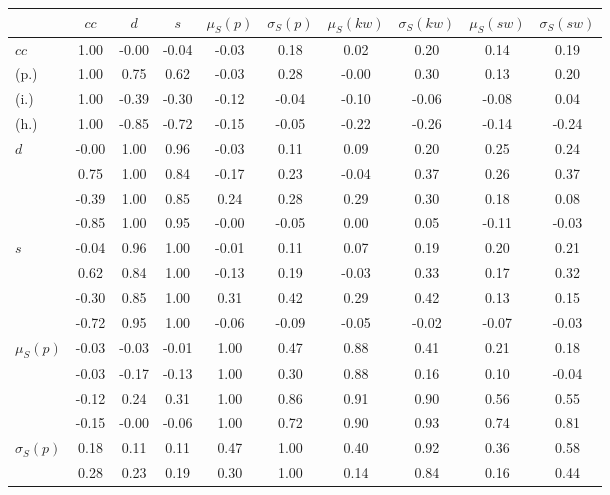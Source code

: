 \begin{table*}[h!]
\begin{center}
\begin{tabular}{| l | c | c | c | c | c | c | c | c | c |}\hline
 & $cc$ & $d$ & $s$ & $\mu_S(p)$ & $\sigma_S(p)$ & $\mu_S(kw)$ & $\sigma_S(kw)$ & $\mu_S(sw)$ & $\sigma_S(sw)$ \\\hline
$cc$ & 1.00  & -0.00  & -0.04  & -0.03  & 0.18  & 0.02  & 0.20  & 0.14  & 0.19 \\\hline
(p.) & 1.00  & 0.75  & 0.62  & -0.03  & 0.28  & -0.00  & 0.30  & 0.13  & 0.20 \\\hline
(i.) & 1.00  & -0.39  & -0.30  & -0.12  & -0.04  & -0.10  & -0.06  & -0.08  & 0.04 \\\hline
(h.) & 1.00  & -0.85  & -0.72  & -0.15  & -0.05  & -0.22  & -0.26  & -0.14  & -0.24 \\\hline
$d$ & -0.00  & 1.00  & 0.96  & -0.03  & 0.11  & 0.09  & 0.20  & 0.25  & 0.24 \\\hline
 & 0.75  & 1.00  & 0.84  & -0.17  & 0.23  & -0.04  & 0.37  & 0.26  & 0.37 \\\hline
 & -0.39  & 1.00  & 0.85  & 0.24  & 0.28  & 0.29  & 0.30  & 0.18  & 0.08 \\\hline
 & -0.85  & 1.00  & 0.95  & -0.00  & -0.05  & 0.00  & 0.05  & -0.11  & -0.03 \\\hline
$s$ & -0.04  & 0.96  & 1.00  & -0.01  & 0.11  & 0.07  & 0.19  & 0.20  & 0.21 \\\hline
 & 0.62  & 0.84  & 1.00  & -0.13  & 0.19  & -0.03  & 0.33  & 0.17  & 0.32 \\\hline
 & -0.30  & 0.85  & 1.00  & 0.31  & 0.42  & 0.29  & 0.42  & 0.13  & 0.15 \\\hline
 & -0.72  & 0.95  & 1.00  & -0.06  & -0.09  & -0.05  & -0.02  & -0.07  & -0.03 \\\hline
$\mu_S(p)$ & -0.03  & -0.03  & -0.01  & 1.00  & 0.47  & 0.88  & 0.41  & 0.21  & 0.18 \\\hline
 & -0.03  & -0.17  & -0.13  & 1.00  & 0.30  & 0.88  & 0.16  & 0.10  & -0.04 \\\hline
 & -0.12  & 0.24  & 0.31  & 1.00  & 0.86  & 0.91  & 0.90  & 0.56  & 0.55 \\\hline
 & -0.15  & -0.00  & -0.06  & 1.00  & 0.72  & 0.90  & 0.93  & 0.74  & 0.81 \\\hline
$\sigma_S(p)$ & 0.18  & 0.11  & 0.11  & 0.47  & 1.00  & 0.40  & 0.92  & 0.36  & 0.58 \\\hline
 & 0.28  & 0.23  & 0.19  & 0.30  & 1.00  & 0.14  & 0.84  & 0.16  & 0.44 \\\hline

\end{tabular}
\end{center}
\end{table*}
